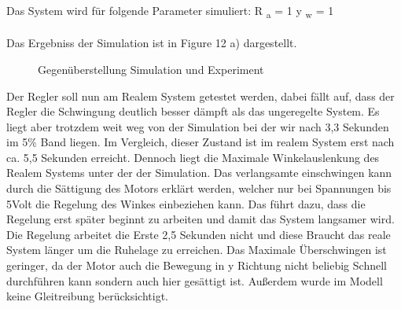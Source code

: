 \documentclass[10pt]{scrartcl}
\begin{document}
\\Das System wird für folgende Parameter simuliert:
R \textsubscript{a} = 1
 y \textsubscript{w} = 1\\
\\Das Ergebniss der Simulation ist in Figure 12 a) dargestellt. 
\begin{figure} [H]
\caption{ Gegenüberstellung Simulation und Experiment} 
\end{figure}
Der Regler soll nun am Realem System getestet werden, dabei fällt auf, dass
der Regler die Schwingung deutlich besser  dämpft  als das ungeregelte System. Es liegt aber trotzdem weit weg von der Simulation bei der wir nach 3,3 Sekunden im 5\% Band liegen. Im Vergleich, dieser Zustand ist im realem System erst nach ca. 5,5 Sekunden erreicht. Dennoch liegt die Maximale Winkelauslenkung des Realem Systems unter der der Simulation. Das verlangsamte einschwingen kann durch die Sättigung des Motors erklärt werden, welcher nur bei Spannungen bis 5Volt die Regelung des Winkes einbeziehen kann. Das führt dazu, dass die Regelung erst später beginnt zu arbeiten und damit das System langsamer wird. Die Regelung arbeitet die Erste 2,5 Sekunden nicht und diese Braucht das reale System länger um die Ruhelage zu erreichen. Das Maximale Überschwingen ist geringer, da der Motor auch die Bewegung in y Richtung nicht beliebig Schnell durchführen kann sondern auch hier gesättigt ist. Außerdem wurde im Modell keine Gleitreibung berücksichtigt.\\
\end{document}
